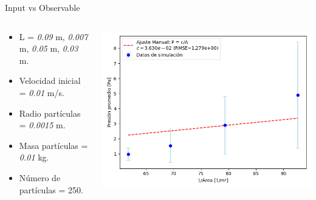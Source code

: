 \documentclass{beamer}
\begin{document}
\begin{frame}{Input vs Observable}
  \begin{columns}
    \begin{column}{0.40\textwidth}
      \scriptsize {}
      \begin{itemize}
        \item L = \textit{0.09} m, \textit{0.007} m, \textit{0.05} m, \textit{0.03} m. 
        \item Velocidad inicial = \textit{0.01} m/s.
        \item Radio partículas = \textit{0.0015} m.
        \item Masa partículas = \textit{0.01} kg.
        \item Número de partículas = 250.
      \end{itemize}
    \end{column}
    \begin{column}{0.60\textwidth}
      \includegraphics[width=1\linewidth]{photoMaterial/Presion_vs_area_ajuste.png}
    \end{column}
  \end{columns}
\end{frame}
\end{document}
